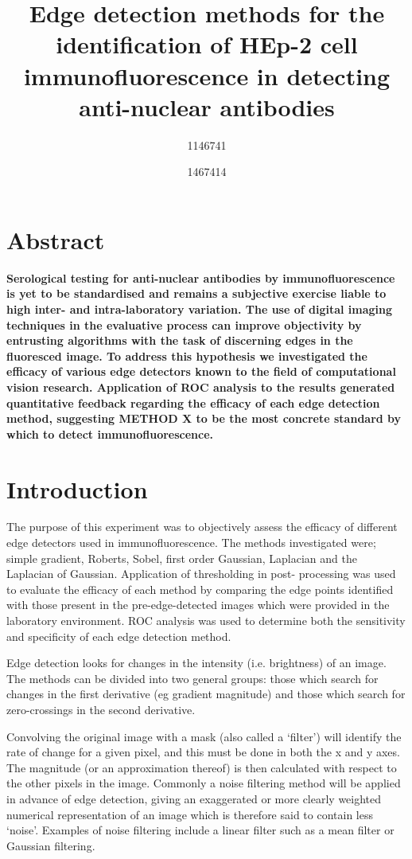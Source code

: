 \documentclass[a4paper]{article}
\title {\vspace{-3ex}Edge detection methods for the identification of HEp-2 cell immunofluorescence in detecting anti-nuclear antibodies}
\author {1146741 \and 1467414}
\begin{document}
\maketitle
\begin{multicols*}{2}


\section*{Abstract}
\textbf{Serological testing for anti-nuclear antibodies by immunofluorescence is yet to be standardised and remains a subjective exercise liable to high inter- and intra-laboratory variation. The use of digital imaging techniques in the evaluative process can improve objectivity by entrusting algorithms with the task of discerning edges in the fluoresced image. To address this hypothesis we investigated the efficacy of various edge detectors known to the field of computational vision research. Application of ROC analysis to the results generated quantitative feedback regarding the efficacy of each edge detection method, suggesting METHOD X to be the most concrete standard by which to detect immunofluorescence.}

\section*{Introduction}

The purpose of this experiment was to objectively assess the efficacy of different edge detectors used in immunofluorescence. The methods investigated were; simple gradient, Roberts, Sobel, first order Gaussian, Laplacian and the Laplacian of Gaussian. Application of thresholding in post- processing was used to evaluate the efficacy of each method by comparing the edge points identified with those present in the pre-edge-detected images which were provided in the laboratory environment. ROC analysis was used to determine both the sensitivity and specificity of each edge detection method. 

Edge detection looks for changes in the intensity (i.e. brightness) of an image. The methods can be divided into two general groups: those which search for changes in the first derivative (eg gradient magnitude) and those which search for zero-crossings in the second derivative. 

Convolving the original image with a mask (also called a ‘filter’) will identify the rate of change for a given pixel, and this must be done in both the x and y axes. The magnitude (or an approximation thereof) is then calculated with respect to the other pixels in the image. Commonly a noise filtering method will be applied in advance of edge detection, giving an exaggerated or more clearly weighted numerical representation of an image which is therefore said to contain less ‘noise’. Examples of noise filtering include a linear filter such as a mean filter or Gaussian filtering.


\end{multicols*}
\end{document}
